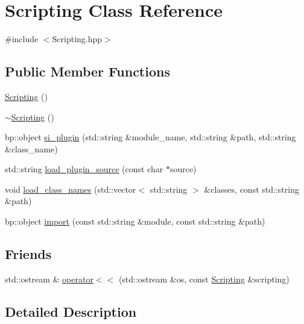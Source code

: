 \hypertarget{class_scripting}{}\section{Scripting Class Reference}
\label{class_scripting}


{\ttfamily \#include $<$Scripting.\+hpp$>$}

\subsection*{Public Member Functions}
\begin{DoxyCompactItemize}
\item 
\mbox{\hyperlink{class_scripting_ab978243f5f2fd597651d6c4c28cb83ca}{Scripting}} ()
\item 
\mbox{\hyperlink{class_scripting_a86954eb45e89b43ffd7b58dbec15e646}{$\sim$\+Scripting}} ()
\item 
bp\+::object \mbox{\hyperlink{class_scripting_a0c97745c04cb674f6ce2debfbf864579}{si\+\_\+plugin}} (std\+::string \&module\+\_\+name, std\+::string \&path, std\+::string \&class\+\_\+name)
\item 
std\+::string \mbox{\hyperlink{class_scripting_ae9b5ef65b37ef02fd3bc6bb93890518b}{load\+\_\+plugin\+\_\+source}} (const char $\ast$source)
\item 
void \mbox{\hyperlink{class_scripting_a0e2761f442fbd7de97a0a90e0ea18678}{load\+\_\+class\+\_\+names}} (std\+::vector$<$ std\+::string $>$ \&classes, const std\+::string \&path)
\item 
bp\+::object \mbox{\hyperlink{class_scripting_a3577d49cf19217ce37230e7f39ed644a}{import}} (const std\+::string \&module, const std\+::string \&path)
\end{DoxyCompactItemize}
\subsection*{Friends}
\begin{DoxyCompactItemize}
\item 
std\+::ostream \& \mbox{\hyperlink{class_scripting_abcaa4273b349e6258949c5b1c7fa8277}{operator$<$$<$}} (std\+::ostream \&os, const \mbox{\hyperlink{class_scripting}{Scripting}} \&scripting)
\end{DoxyCompactItemize}


\subsection{Detailed Description}


